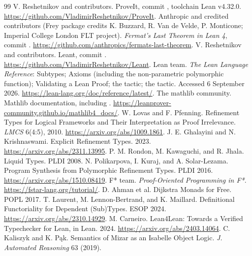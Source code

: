 \begin{thebibliography}{99}
 V. Reshetnikov and contributors. ProveIt, commit , toolchain Lean v4.32.0. \url{https://github.com/VladimirReshetnikov/ProveIt}.
 Anthropic and credited contributors (Frey package credits K. Buzzard, R. Van de Velde, P. Monticone; Imperial College London FLT project). \emph{Fermat's Last Theorem in Lean 4}, commit . \url{https://github.com/anthropics/fermats-last-theorem}.
 V. Reshetnikov and contributors. Leant, commit . \url{https://github.com/VladimirReshetnikov/Leant}.
 Lean team. \emph{The Lean Language Reference}: Subtypes; Axioms (including the non-parametric polymorphic function); Validating a Lean Proof; the  tactic; the  tactic. Accessed 6 September 2026. \url{https://lean-lang.org/doc/reference/latest/}.
 The mathlib community. Mathlib documentation, including . \url{https://leanprover-community.github.io/mathlib4_docs/}.
 W. Lovas and F. Pfenning. Refinement Types for Logical Frameworks and Their Interpretation as Proof Irrelevance. \emph{LMCS} 6(4:5), 2010. \url{https://arxiv.org/abs/1009.1861}.
 J. E. Ghalayini and N. Krishnaswami. Explicit Refinement Types. 2023. \url{https://arxiv.org/abs/2311.13995}.
 P. M. Rondon, M. Kawaguchi, and R. Jhala. Liquid Types. PLDI 2008.
 N. Polikarpova, I. Kuraj, and A. Solar-Lezama. Program Synthesis from Polymorphic Refinement Types. PLDI 2016. \url{https://arxiv.org/abs/1510.08419}.
 F* team. \emph{Proof-Oriented Programming in F*}. \url{https://fstar-lang.org/tutorial/}.
 D. Ahman et al. Dijkstra Monads for Free. POPL 2017.
 T. Laurent, M. Lennon-Bertrand, and K. Maillard. Definitional Functoriality for Dependent (Sub)Types. ESOP 2024. \url{https://arxiv.org/abs/2310.14929}.
 M. Carneiro. Lean4Lean: Towards a Verified Typechecker for Lean, in Lean. 2024. \url{https://arxiv.org/abs/2403.14064}.
 C. Kaliszyk and K. P\k{a}k. Semantics of Mizar as an Isabelle Object Logic. \emph{J. Automated Reasoning} 63 (2019).
\end{thebibliography}
